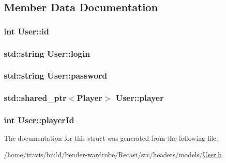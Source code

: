 \subsection{Member Data Documentation}
\hypertarget{struct_user_aa7e6e39b43020bbe9c3a196b3689b0f7}{
\subsubsection[{id}]{\setlength{\rightskip}{0pt plus 5cm}int User\-::id}}\label{struct_user_aa7e6e39b43020bbe9c3a196b3689b0f7}
\hypertarget{struct_user_a68ef4336327a1ee8b4532a6042485f3a}{
\subsubsection[{login}]{\setlength{\rightskip}{0pt plus 5cm}std\-::string User\-::login}}\label{struct_user_a68ef4336327a1ee8b4532a6042485f3a}
\hypertarget{struct_user_ac2f2e75b15e8eb6cbb030fc85a6cd59f}{
\subsubsection[{password}]{\setlength{\rightskip}{0pt plus 5cm}std\-::string User\-::password}}\label{struct_user_ac2f2e75b15e8eb6cbb030fc85a6cd59f}
\hypertarget{struct_user_a55d128918fa7d3e66120d392092227fd}{
\subsubsection[{player}]{\setlength{\rightskip}{0pt plus 5cm}std\-::shared\-\_\-ptr$<${\bf Player}$>$ User\-::player}}\label{struct_user_a55d128918fa7d3e66120d392092227fd}
\hypertarget{struct_user_add1a0a4d41bf6d364738b19f2cee96a6}{
\subsubsection[{player\-Id}]{\setlength{\rightskip}{0pt plus 5cm}int User\-::player\-Id}}\label{struct_user_add1a0a4d41bf6d364738b19f2cee96a6}


The documentation for this struct was generated from the following file\-:\begin{DoxyCompactItemize}
\item 
/home/travis/build/bender-\/wardrobe/\-Recast/src/headers/models/\hyperlink{_user_8h}{User.\-h}\end{DoxyCompactItemize}
